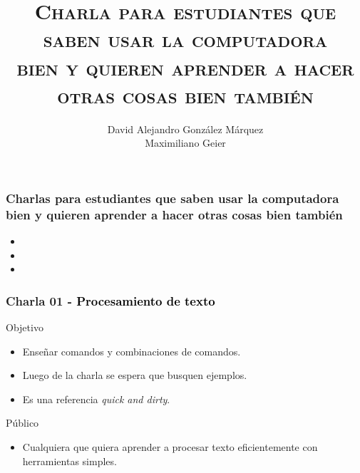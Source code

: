 \documentclass{beamer}
\title[]{\large \textsc{Charla para estudiantes que saben usar la computadora\\ bien y quieren aprender a hacer otras cosas bien también}}
\author[D. Gonz\'alez M\'arquez, M. Geier]{
  \footnotesize{David Alejandro Gonz\'alez M\'arquez}\\
  \footnotesize{Maximiliano Geier}
}
\date{}
\begin{document}
\begin{frame}[plain]
\vspace{2cm}
  \titlepage
\end{frame}

\begin{frame}[fragile]
    \frametitle{Charlas para estudiantes que saben usar la computadora\\ bien y quieren aprender a hacer otras cosas bien también}
    \begin{itemize}
    \setlength\itemsep{1cm}
    \Large
    \item[] 
    \item[] 
    \item[] 
    \end{itemize}
\end{frame}

\begin{frame}[fragile]
    \frametitle{Charla 01 \textcolor{black}{- Procesamiento de texto}}
    Objetivo
    \begin{itemize}
    \setlength\itemsep{0.5cm}
    \item Enseñar comandos y combinaciones de comandos.
    \item Luego de la charla se espera que busquen ejemplos.
    \item Es una referencia \emph{quick and dirty}.
    \end{itemize}
    \vspace{1cm}
    Público 
    \begin{itemize} 
    \setlength\itemsep{0.5cm}
    \item Cualquiera que quiera aprender a procesar texto eficientemente con herramientas simples.
    \end{itemize}
\end{frame}
\end{document}
